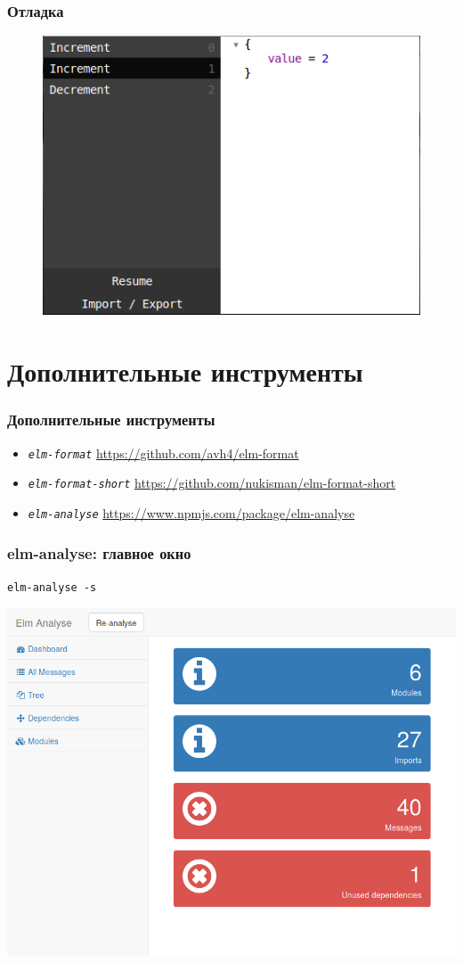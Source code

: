 \documentclass[11pt,aspectratio=169]{beamer}
\begin{document}
\begin{frame}
\frametitle{Отладка}
\begin{figure}
	\includegraphics[scale=0.5]{elm-app-sample-state-previous}
\end{figure}
\end{frame}

\section{Дополнительные инструменты}

\begin{frame}
\frametitle{Дополнительные инструменты}
\begin{itemize}
	\item \textit{\texttt{elm-format}} \url{https://github.com/avh4/elm-format}
	\item \textit{\texttt{elm-format-short}} \url{https://github.com/nukisman/elm-format-short}
	\item \textit{\texttt{elm-analyse}} \url{https://www.npmjs.com/package/elm-analyse}
\end{itemize}
\end{frame}

\begin{frame}
\frametitle{elm-analyse: главное окно}
\center\texttt{elm-analyse -s}

\includegraphics[scale=0.3]{elm-analyse-in-browser-main}
\end{frame}
\end{document}
